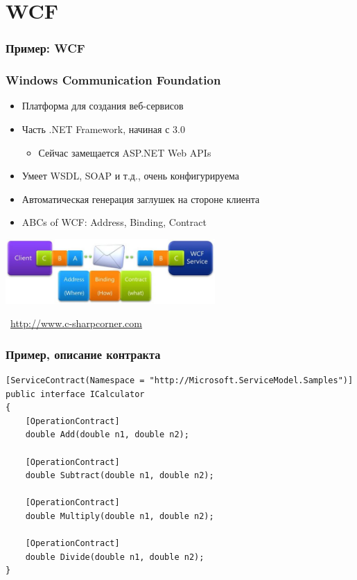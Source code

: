 \documentclass[xetex,mathserif,serif]{beamer}
\newcommand{\attribution}[1] {
    \vspace{-5mm}\begin{flushright}\begin{scriptsize}\textcolor{gray}{\textcopyright\, #1}\end{scriptsize}\end{flushright}
}
\begin{document}
    \section{WCF}

    \begin{frame}
        \frametitle{Пример: WCF}
        \frametitle{Windows Communication Foundation}
        \begin{itemize}
            \item Платформа для создания веб-сервисов
            \item Часть .NET Framework, начиная с 3.0
            \begin{itemize}
                \item Сейчас замещается ASP.NET Web APIs 
            \end{itemize}
            \item Умеет WSDL, SOAP и т.д., очень конфигурируема
            \item Автоматическая генерация заглушек на стороне клиента
            \item ABCs of WCF: Address, Binding, Contract
        \end{itemize}
        \begin{center}
            \includegraphics[width=0.6\textwidth]{wcf.png}
            \attribution{\url{http://www.c-sharpcorner.com}}
        \end{center}
    \end{frame}

    \begin{frame}[fragile]
        \frametitle{Пример, описание контракта}
        \begin{small}
            \begin{verbatim}
[ServiceContract(Namespace = "http://Microsoft.ServiceModel.Samples")]  
public interface ICalculator  
{
    [OperationContract]
    double Add(double n1, double n2);

    [OperationContract]
    double Subtract(double n1, double n2);

    [OperationContract]
    double Multiply(double n1, double n2);

    [OperationContract]
    double Divide(double n1, double n2);
}
            \end{verbatim}
        \end{small}
    \end{frame}
\end{document}
